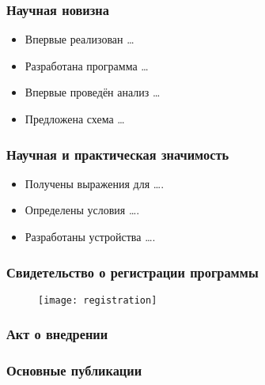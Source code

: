 \begin{frame}
    \frametitle{Научная новизна}
    \begin{itemize}
        \item Впервые реализован \dots
        \item Разработана программа \dots
        \item Впервые проведён анализ \dots
        \item Предложена схема \dots
    \end{itemize}
\end{frame}

\begin{frame}
    \frametitle{Научная и практическая значимость}
    \begin{itemize}
        \item Получены выражения для \dots.
        \item Определены условия \dots.
        \item Разработаны устройства \dots.
    \end{itemize}
\end{frame}

\begin{frame}
    \frametitle{Свидетельство о регистрации программы}
    \begin{figure}[h]
        \centering
        \texttt{[image: registration]}
    \end{figure}
\end{frame}

\begin{frame}
    \frametitle{Акт о внедрении}
    \begin{figure}[h]
        \centering
    \end{figure}
\end{frame}

\begin{frame} %
    \frametitle{Основные публикации}
\end{frame}

